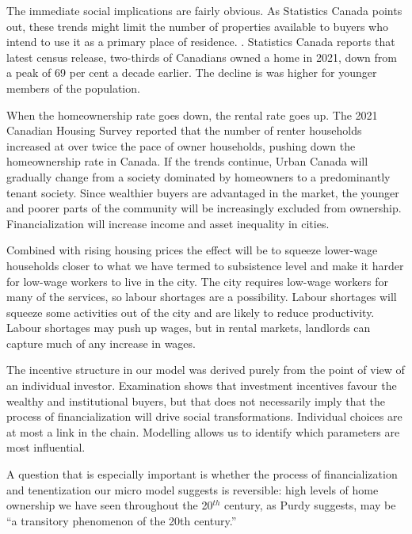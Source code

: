 The immediate social implications are fairly obvious. As Statistics Canada points out, these trends might limit the number of properties available to buyers who intend to use it as a primary place of residence. \cite{fontaineResidentialRealEstate2023}. Statistics Canada reports that latest census release, two-thirds of Canadians owned a home in 2021, down from a peak of 69 per cent a decade earlier. The decline is was higher for younger members of the population. 

When the homeownership rate goes down, the rental rate goes up. The 2021 Canadian Housing Survey reported that the number of renter households increased  at over twice the pace of owner households, pushing down the homeownership rate in Canada. If the trends continue, Urban Canada will gradually change from a society dominated by homeowners to a predominantly tenant society. Since wealthier buyers are advantaged in the market, the younger and poorer parts of the community will be increasingly excluded from ownership. Financialization will increase income and asset inequality in cities.

Combined with rising housing prices the effect will be to squeeze lower-wage households closer to what we have termed to subsistence level and make it harder for low-wage workers to live in the city. The city requires low-wage workers for many of the services, so labour shortages are a possibility. Labour shortages will squeeze some activities out of the city and are likely to reduce productivity. Labour shortages may push up wages, but in rental markets, landlords can capture much of any increase in wages. 

The incentive structure in our model was derived purely from the point of view of an individual investor. Examination shows that investment incentives favour the wealthy and institutional buyers, but that does not necessarily imply that the process of financialization will drive social transformations. Individual choices are at most  a link in the chain. Modelling  allows us to identify which parameters are most influential. 

A question that is especially important is whether the process of financialization and tenentization our micro model suggests is reversible:  high levels of home ownership we have seen throughout the 20$^{th}$ century, as Purdy \cite{purdyPropertyOwningDemocracyHome1993} suggests, may be ``a transitory phenomenon of the 20th century.''


